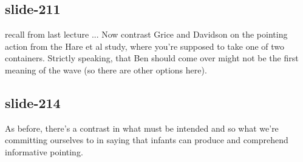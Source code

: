 \documentclass[12pt,\papersize]{extarticle}
\begin{document}
 
\subsection{slide-211}
recall from last lecture ...
Now contrast Grice and Davidson on the pointing action from the Hare et al study, where you're supposed to take one of two containers.
Strictly speaking, that Ben should come over might not be the first meaning of the wave (so there are other options here).
 
 
\subsection{slide-214}
As before, there's a contrast in what must be intended and so what we're committing ourselves to in saying that infants can produce and comprehend informative pointing.


 






\end{document}
